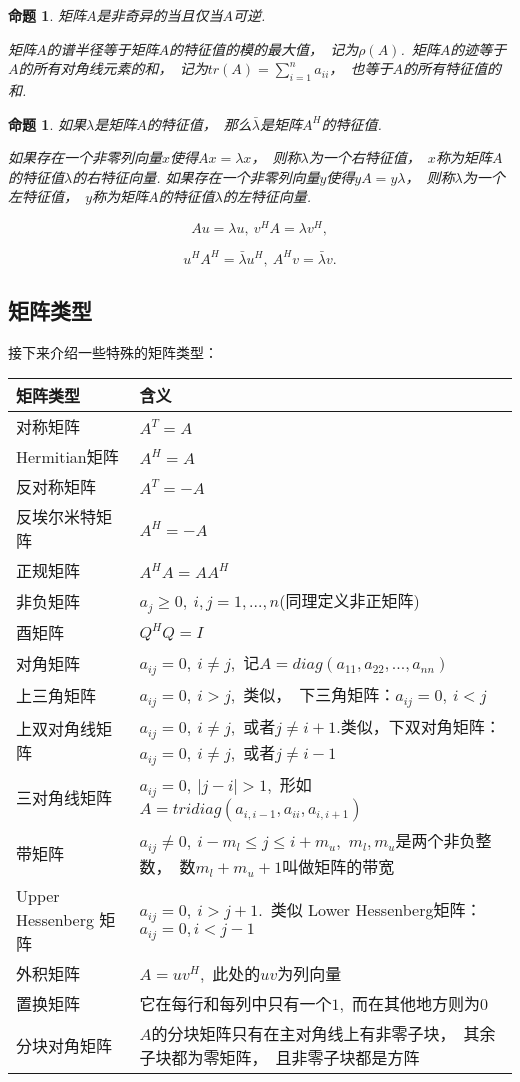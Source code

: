 \documentclass{article}
\begin{document}
\newtheorem{proposition}{命题}
\begin{proposition}
矩阵$A$是非奇异的当且仅当$A$可逆.

矩阵$A$的谱半径等于矩阵$A$的特征值的模的最大值，~记为$\rho (A)$.~矩阵$A$的迹等于$A$的所有对角线元素的和，~记为$tr(A)=\sum_{i=1}^n a_{ii}$，~也等于$A$的所有特征值的和.
\end{proposition}

\newtheorem{proposition}{命题}
\begin{proposition}
如果$\lambda$是矩阵$A$的特征值，~那么$\bar\lambda$是矩阵$A^H$的特征值.

如果存在一个非零列向量$x$使得$Ax=\lambda x$，~则称$\lambda $为一个右特征值，~$x$称为矩阵$A$的特征值$\lambda $的右特征向量.
如果存在一个非零列向量$y$使得$yA=y\lambda$，~则称$\lambda $为一个左特征值，~$y$称为矩阵$A$的特征值$\lambda $的左特征向量.

$$Au=\lambda u,~v^HA=\lambda v^H,$$

$$u^HA^H=\bar{\lambda}u^H,~ A^Hv=\bar{\lambda}v.$$
\end{proposition}

\subsection{矩阵类型}
接下来介绍一些特殊的矩阵类型：

\begin{tabular}{ |l|l| }   
\hline   
矩阵类型 & 含义\\
\hline
对称矩阵 & $A^T=A$ \\
\hline
Hermitian矩阵 & $A^H=A$ \\
\hline
反对称矩阵 & $A^T=-A$ \\
\hline
反埃尔米特矩阵 &  $A^H=-A$ \\
\hline
正规矩阵 &  $A^HA=AA^H$ \\
\hline
非负矩阵 & $a_{j}\ge 0,\ i,j=1,...,n$(同理定义非正矩阵) \\
\hline
酉矩阵 & $Q^HQ=I$ \\
\hline 
对角矩阵 & $a_{ij}=0,\ i\neq j$,\ 记$A=diag(a_{11},a_{22},...,a_{nn})$ \\
\hline
上三角矩阵 & $a_{ij}=0,\ i>j$,\ 类似，\ 下三角矩阵：$a_{ij}=0,\ i<j$ \\
\hline
上双对角线矩阵 & $a_{ij}=0,\ i\neq j$,\ 或者$j\neq i+1$.类似，下双对角矩阵：$a_{ij}=0,\ i\neq j$,\ 或者$j\neq i-1$ \\
\hline 
三对角线矩阵 & $a_{ij}=0,\ |j-i|>1$,\ 形如$A=tridiag(a_{i,i-1},a_{ii},a_{i,i+1})$ \\
\hline
带矩阵 & $a_{ij}\neq 0,\ i-m_l\leqslant j\leqslant i+m_u$,\ $m_l,m_u$是两个非负整数，\ 数$m_l+m_u+1$叫做矩阵的带宽 \\
\hline
Upper Hessenberg 矩阵 & $a_{ij}=0,\ i>j+1$.\ 类似 Lower Hessenberg矩阵：$a_{ij}=0,i<j-1$ \\
\hline 
外积矩阵 & $A=uv^H$,\ 此处的$uv$为列向量 \\
\hline
置换矩阵 &它在每行和每列中只有一个$1$,\ 而在其他地方则为$0$ \\
\hline
分块对角矩阵 & $A$的分块矩阵只有在主对角线上有非零子块，\ 其余子块都为零矩阵，\ 且非零子块都是方阵 \\
\hline
\end{tabular}
\end{document}
